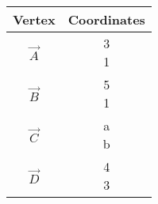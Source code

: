 \begin{tabular}[12pt]{ |c| c|}
    \hline
    \textbf{Vertex} & \textbf{Coordinates}\\ 
    \hline
    $\vec{A}$ & \myvec{3 \\ 1} \\
    \hline 
    $\vec{B}$ & \myvec{5 \\ 1}\\
    \hline
    $\vec{C}$ & \myvec{a \\ b}\\
    \hline
    $\vec{D}$ & \myvec{4 \\ 3}\\
    \hline
    \end{tabular}
